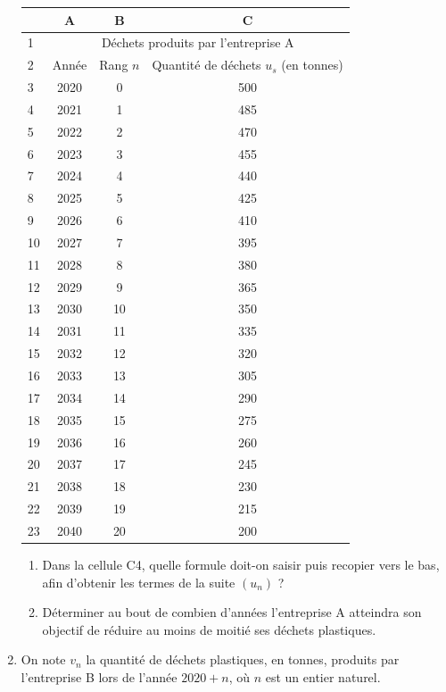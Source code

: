 \documentclass[10pt]{article}
\begin{document}
\begin{enumerate}
\begin{center}
\begin{tabular}{|l|c|c|c|}
\hline
 & A & B & C \\
\hline
1 & \multicolumn{3}{|c|}{Déchets produits par l'entreprise A} \\
\hline
2 & Année & Rang $n$ & Quantité de déchets $u_{s}$ (en tonnes) \\
\hline
3 & 2020 & 0 & 500 \\
\hline
4 & 2021 & 1 & 485 \\
\hline
5 & 2022 & 2 & 470 \\
\hline
6 & 2023 & 3 & 455 \\
\hline
7 & 2024 & 4 & 440 \\
\hline
8 & 2025 & 5 & 425 \\
\hline
9 & 2026 & 6 & 410 \\
\hline
10 & 2027 & 7 & 395 \\
\hline
11 & 2028 & 8 & 380 \\
\hline
12 & 2029 & 9 & 365 \\
\hline
13 & 2030 & 10 & 350 \\
\hline
14 & 2031 & 11 & 335 \\
\hline
15 & 2032 & 12 & 320 \\
\hline
16 & 2033 & 13 & 305 \\
\hline
17 & 2034 & 14 & 290 \\
\hline
18 & 2035 & 15 & 275 \\
\hline
19 & 2036 & 16 & 260 \\
\hline
20 & 2037 & 17 & 245 \\
\hline
21 & 2038 & 18 & 230 \\
\hline
22 & 2039 & 19 & 215 \\
\hline
23 & 2040 & 20 & 200 \\
\hline
\end{tabular}
\end{center}
	\begin{enumerate}[resume]
		\item  Dans la cellule \textsf{C4}, quelle formule doit-on saisir puis recopier vers le bas, afin d'obtenir les termes de la suite $\left(u_{n}\right)$ ?
		\item  Déterminer au bout de combien d'années l'entreprise A atteindra son objectif de réduire au moins de moitié ses déchets plastiques.
	\end{enumerate}
\item On note $v_{n}$ la quantité de déchets plastiques, en tonnes, produits par l'entreprise B lors de l'année $2020+n$, où $n$ est un entier naturel.


\end{enumerate}
\end{document}
